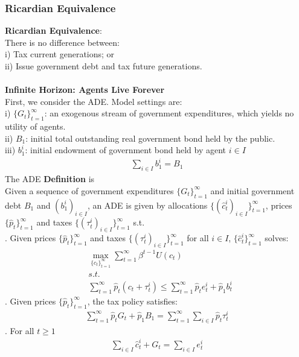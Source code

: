 \documentclass{article}
\begin{document}
\subsubsection{Ricardian Equivalence}
\textbf{Ricardian Equivalence}:\\
There is no difference between:\\
\indent i) Tax current generations; or\\
\indent ii) Issue government debt and tax future generations.\\\\
\textbf{Infinite Horizon: Agents Live Forever}\\
First, we consider the ADE. Model settings are:\\
\indent i) $\{G_t\}^\infty_{t=1}$: an exogenous stream of government expenditures, which yields no utility of agents.\\
\indent ii) $B_1$: initial total outstanding real government bond held by the public.\\
\indent iii) $b^i_1$: initial endowment of government bond held by agent $i \in I$
	\begin{align*}
		\sum\limits_{i \in I}b^i_1 = B_1
	\end{align*}
The ADE \textbf{Definition} is\\
Given a sequence of government expenditures $\{G_t\}^\infty_{t=1}$ and initial government debt $B_1$ and $(b^i_1)_{i \in I}$, an ADE is given by allocations $\{(\hat{c}^i_t)_{i \in I}\}^\infty_{t=1}$, prices $\{\hat{p}_t\}^\infty_{t=1}$ and taxes $\{(\tau^i_t)_{i \in I}\}^\infty_{t=1}$ s.t.\\
. Given prices $\{\hat{p}_t\}^\infty_{t=1}$ and taxes $\{(\tau^i_t)_{i \in I}\}^\infty_{t=1}$ for all $i \in I$, $\{\hat{c}^i_t\}^\infty_{t=1}$ solves:
	\begin{align*}
		&\mathop{max}\limits_{\{c_t\}^\infty_{t=1}} \sum\limits^\infty_{t=1} \beta^{t-1} U(c_t)\\
		&s.t.\\
		&\sum\limits^\infty_{t=1} \hat{p}_t(c_t + \tau^i_t) \leq \sum\limits^\infty_{t=1}\hat{p}_te^i_t + \hat{p}_1 b^i_t
	\end{align*}
. Given prices $\{\hat{p}_t\}^\infty_{t=1}$, the tax policy satisfies:
	\begin{align*}
		\sum\limits^\infty_{t=1}\hat{p}_t G_t + \hat{p}_1 B_1 = \sum\limits^\infty_{t=1} \sum\limits_{i \in I}\hat{p}_t \tau^i_t
	\end{align*}
. For all $t \geq 1$
	\begin{align*}
		\sum\limits_{i \in I}\hat{c}^i_t + G_t = \sum\limits_{i \in I}e^i_t
	\end{align*}
\end{document}
